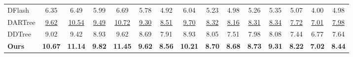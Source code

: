 \begin{table}[t]
\begin{tabular*}{\textwidth}{@{\extracolsep{\fill}}l*{14}{c}@{}}
DFlash & 6.35 & 6.49 & 5.99 & 6.69 & 5.78 & 4.92 & 6.04 & 5.23 & 4.98 & 5.26 & 5.35 & 5.07 & 4.00 & 4.98 \\
DARTree & \underline{9.62} & \underline{10.54} & \underline{9.49} & \underline{10.72} & \underline{9.30} & \underline{8.51} & \underline{9.70} & \underline{8.32} & \underline{8.16} & \underline{8.31} & \underline{8.34} & \underline{7.72} & \underline{7.01} & \underline{7.98} \\
DDTree & 9.02 & 9.42 & 8.93 & 9.62 & 8.69 & 7.91 & 8.93 & 8.05 & 7.51 & 7.98 & 8.08 & 7.44 & 6.77 & 7.64 \\
\textbf{Ours} & \textbf{10.67} & \textbf{11.14} & \textbf{9.82} & \textbf{11.45} & \textbf{9.62} & \textbf{8.56} & \textbf{10.21} & \textbf{8.70} & \textbf{8.68} & \textbf{8.73} & \textbf{9.31} & \textbf{8.22} & \textbf{7.02} & \textbf{8.44} \\
\bottomrule
\end{tabular*}
\end{table}
